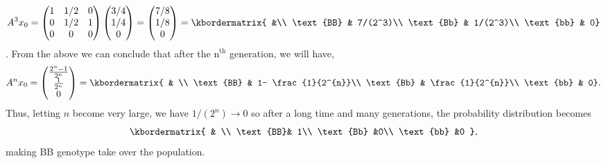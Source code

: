 \documentclass{ximera}
\begin{document}
\[
A^{3}x_{0}= \begin{pmatrix} 1 & 1/2& 0\\
0 & 1/2 & 1\\
0 & 0 &0
\end{pmatrix} \begin{pmatrix} 3/4\\
1/4\\
0 
\end{pmatrix} = \begin{pmatrix} 7/8\\
1/8\\
0\end{pmatrix} = \kbordermatrix{ &\\
\text{BB} & 7/(2^3)\\
\text{Bb} & 1/(2^3)\\
\text{bb} & 0}\].
From the above we can conclude that after the n$^{\text{th}}$ generation, we will have,
\[
A^{n}x_{0} = \begin{pmatrix} \frac{2^{n}-1}{2^{n}}\\
\frac{1}{2^n}\\
0
\end{pmatrix}
= \kbordermatrix{ & \\
\text{BB} & 1- \frac{1}{2^{n}}\\
\text{Bb} & \frac{1}{2^{n}}\\
\text{bb} & 0}.\]
Thus, letting $n$ become very large, we have $1/(2^{n}) \rightarrow 0$ so after a long time and many generations, the probability distribution becomes 
\[\kbordermatrix{ & \\
\text{BB}& 1\\
\text{Bb} &0\\
\text{bb} &0
},\]
making BB genotype take over the population. 
\end{document}
